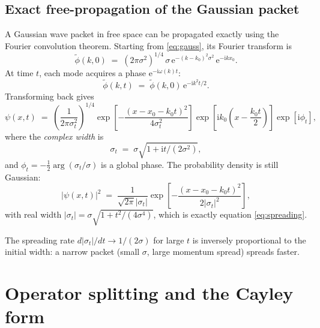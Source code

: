\documentclass[12pt, a4paper]{article}
\newcommand{\ii}{\mathrm{i}}          %
\newcommand{\ee}{\mathrm{e}}          %
\begin{document}
\subsection{Exact free-propagation of the Gaussian packet}

A Gaussian wave packet in free space can be propagated exactly using
the Fourier convolution theorem.  Starting from \eqref{eq:gauss}, its
Fourier transform is
\begin{equation}
  \tilde{\phi}(k,0) \;=\;
  (2\pi\sigma^2)^{1/4}\,\sigma\,\ee^{-(k-k_0)^2\sigma^2}\,\ee^{-\ii k x_0}.
\end{equation}
At time $t$, each mode acquires a phase $\ee^{-\ii\omega(k)t}$:
\begin{equation}
  \tilde{\phi}(k,t) \;=\; \tilde{\phi}(k,0)\,\ee^{-\ii k^2 t/2}.
\end{equation}
Transforming back gives
\begin{equation}
  \psi(x,t) \;=\;
  \left(\frac{1}{2\pi\sigma_t^2}\right)^{1/4}
  \exp\!\left[-\frac{(x - x_0 - k_0 t)^2}{4\sigma_t^2}\right]
  \exp\!\left[\ii k_0\!\left(x - \frac{k_0 t}{2}\right)\right]
  \exp\!\left[\ii\phi_t\right],
  \label{eq:free_packet}
\end{equation}
where the \emph{complex width} is
\begin{equation}
  \sigma_t \;=\; \sigma\sqrt{1 + \ii t/(2\sigma^2)},
\end{equation}
and $\phi_t = -\frac{1}{2}\arg(\sigma_t/\sigma)$ is a global phase.
The probability density is still Gaussian:
\begin{equation}
  |\psi(x,t)|^2 \;=\;
  \frac{1}{\sqrt{2\pi}|\sigma_t|}
  \exp\!\left[-\frac{(x-x_0-k_0 t)^2}{2|\sigma_t|^2}\right],
\end{equation}
with real width $|\sigma_t| = \sigma\sqrt{1 + t^2/(4\sigma^4)}$,
which is exactly equation \eqref{eq:spreading}.

The spreading rate $d|\sigma_t|/dt \to 1/(2\sigma)$ for large $t$
is inversely proportional to the initial width: a narrow packet
(small $\sigma$, large momentum spread) spreads faster.

\section{Operator splitting and the Cayley form}
\label{app:splitting}
\end{document}
